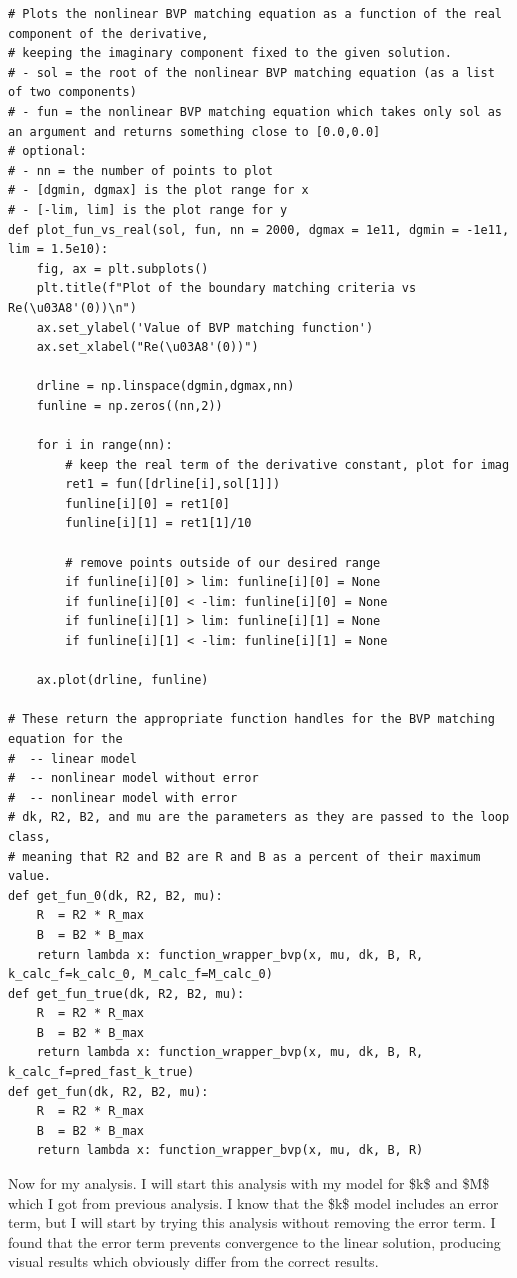 \documentclass{article}
\begin{document}
\begin{lstlisting}
# Plots the nonlinear BVP matching equation as a function of the real component of the derivative,
# keeping the imaginary component fixed to the given solution.
# - sol = the root of the nonlinear BVP matching equation (as a list of two components)
# - fun = the nonlinear BVP matching equation which takes only sol as an argument and returns something close to [0.0,0.0]
# optional:
# - nn = the number of points to plot
# - [dgmin, dgmax] is the plot range for x
# - [-lim, lim] is the plot range for y
def plot_fun_vs_real(sol, fun, nn = 2000, dgmax = 1e11, dgmin = -1e11, lim = 1.5e10):
    fig, ax = plt.subplots()
    plt.title(f"Plot of the boundary matching criteria vs Re(\u03A8'(0))\n")
    ax.set_ylabel('Value of BVP matching function')
    ax.set_xlabel("Re(\u03A8'(0))")
    
    drline = np.linspace(dgmin,dgmax,nn)
    funline = np.zeros((nn,2))

    for i in range(nn):
        # keep the real term of the derivative constant, plot for imag
        ret1 = fun([drline[i],sol[1]])
        funline[i][0] = ret1[0]
        funline[i][1] = ret1[1]/10

        # remove points outside of our desired range
        if funline[i][0] > lim: funline[i][0] = None
        if funline[i][0] < -lim: funline[i][0] = None
        if funline[i][1] > lim: funline[i][1] = None
        if funline[i][1] < -lim: funline[i][1] = None

    ax.plot(drline, funline)

# These return the appropriate function handles for the BVP matching equation for the
#  -- linear model
#  -- nonlinear model without error
#  -- nonlinear model with error
# dk, R2, B2, and mu are the parameters as they are passed to the loop class,
# meaning that R2 and B2 are R and B as a percent of their maximum value.
def get_fun_0(dk, R2, B2, mu):
    R  = R2 * R_max
    B  = B2 * B_max
    return lambda x: function_wrapper_bvp(x, mu, dk, B, R, k_calc_f=k_calc_0, M_calc_f=M_calc_0)
def get_fun_true(dk, R2, B2, mu):
    R  = R2 * R_max
    B  = B2 * B_max
    return lambda x: function_wrapper_bvp(x, mu, dk, B, R, k_calc_f=pred_fast_k_true)
def get_fun(dk, R2, B2, mu):
    R  = R2 * R_max
    B  = B2 * B_max
    return lambda x: function_wrapper_bvp(x, mu, dk, B, R)\end{lstlisting}

Now for my analysis. I will start this analysis with my model for \$k\$ and \$M\$ which I got from previous analysis. I know that the \$k\$ model includes an error term, but I will start by trying this analysis without removing the error term. I found that the error term prevents convergence to the linear solution, producing visual results which obviously differ from the correct results.
\end{document}
